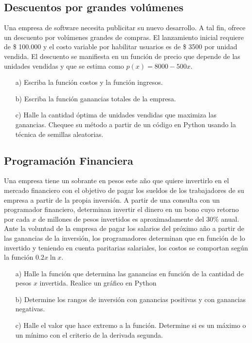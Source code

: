 \documentclass[12pt]{article}
\begin{document}
\subsection{Descuentos por grandes volúmenes }

Una empresa de software necesita publicitar su nuevo desarrollo. A tal fin, ofrece un descuento por volúmenes grandes de compras. El lanzamiento inicial requiere de \$ 100.000 y el costo variable por habilitar usuarios es de \$ 3500 por unidad vendida. El descuento se manifiesta en un función de precio que depende de las unidades vendidas y que se estima como $p(x) = 8000 - 500x$.
\begin{itemize}
    \item[a)] Escriba la función costos y la función ingresos.
    \item[b)] Escriba la función ganancias totales de la empresa.
    \item[c)] Halle la cantidad óptima de unidades vendidas que maximiza las ganancias. Chequee su método a partir de un código en Python usando la técnica de semillas aleatorias.
\end{itemize}

\subsection{Programación Financiera}

Una empresa tiene un sobrante en pesos este año que quiere invertirlo en el mercado financiero con el objetivo de pagar los sueldos de los trabajadores de su empresa a partir de la propia inversión. A partir de una consulta con un programador financiero, determinan invertir el dinero en un bono cuyo retorno por cada $x$ de millones de pesos invertidos es aproximadamente del 30\% anual. Ante la voluntad de la empresa de pagar los salarios del próximo año a partir de las ganancias de la inversión, los programadores determinan que en función de lo invertido y teniendo en cuenta paritarias salariales, los costos se comportan según la función $0.2 x \ln x$. 
\begin{itemize}
    \item[a)] Halle la función que determina las ganancias en función de la cantidad de pesos $x$ invertida. Realice un gráfico en Python
    \item[b)] Determine los rangos de inversión con ganancias positivas y con ganancias negativas.
    \item[c)] Halle el valor que hace extremo a la función. Determine si es un máximo o un mínimo con el criterio de la derivada segunda.
\end{itemize}
\end{document}
